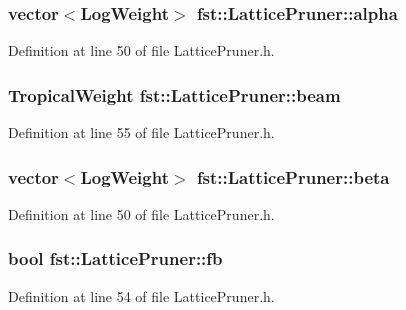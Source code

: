 \subsubsection[{alpha}]{\setlength{\rightskip}{0pt plus 5cm}vector$<$Log\+Weight$>$ fst\+::\+Lattice\+Pruner\+::alpha}\hypertarget{classfst_1_1_lattice_pruner_a6d15772df115fcd55910b6e6b3d4f28c}{}\label{classfst_1_1_lattice_pruner_a6d15772df115fcd55910b6e6b3d4f28c}


Definition at line 50 of file Lattice\+Pruner.\+h.

\subsubsection[{beam}]{\setlength{\rightskip}{0pt plus 5cm}Tropical\+Weight fst\+::\+Lattice\+Pruner\+::beam}\hypertarget{classfst_1_1_lattice_pruner_abdf2a2d041bba147d7a7199fcafedd36}{}\label{classfst_1_1_lattice_pruner_abdf2a2d041bba147d7a7199fcafedd36}


Definition at line 55 of file Lattice\+Pruner.\+h.

\subsubsection[{beta}]{\setlength{\rightskip}{0pt plus 5cm}vector$<$Log\+Weight$>$ fst\+::\+Lattice\+Pruner\+::beta}\hypertarget{classfst_1_1_lattice_pruner_a13bcf628dbceba07d4a7c4a9a0651370}{}\label{classfst_1_1_lattice_pruner_a13bcf628dbceba07d4a7c4a9a0651370}


Definition at line 50 of file Lattice\+Pruner.\+h.

\subsubsection[{fb}]{\setlength{\rightskip}{0pt plus 5cm}bool fst\+::\+Lattice\+Pruner\+::fb}\hypertarget{classfst_1_1_lattice_pruner_a0334f1638ddf39db90c820f9921fb689}{}\label{classfst_1_1_lattice_pruner_a0334f1638ddf39db90c820f9921fb689}


Definition at line 54 of file Lattice\+Pruner.\+h.

